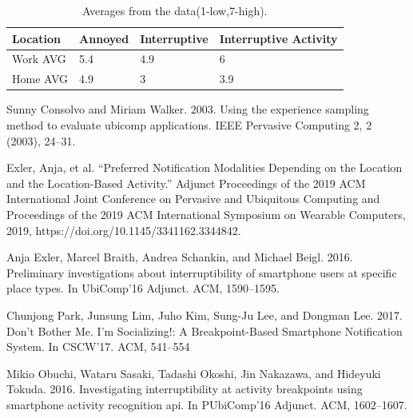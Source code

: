 \documentclass{vgtc}                          %
\begin{document}
\begin{table}[tb]
  \caption{Averages from the data(1-low,7-high).}
  \label{tab:vis_papers}
  \scriptsize%
	\centering%
  \begin{tabular}{|l|l|l|l|}
\hline
Location & Annoyed & Interruptive & Interruptive Activity \\ \hline
Work AVG    & 5.4                 & 4.9                  & 6                            \\ \hline
Home AVG     & 4.9                 & 3                    & 3.9                          \\ \hline
\end{tabular}
\end{table}




%

%
%
%


Sunny Consolvo and Miriam Walker. 2003. Using the experience sampling method to evaluate ubicomp applications. IEEE Pervasive Computing 2, 2 (2003), 24–31.

 Exler, Anja, et al. “Preferred Notification Modalities Depending on the Location and the Location-Based Activity.” Adjunct Proceedings of the 2019 ACM International Joint Conference on Pervasive and Ubiquitous Computing and Proceedings of the 2019 ACM International Symposium on Wearable Computers, 2019, https://doi.org/10.1145/3341162.3344842. 
 
 Anja Exler, Marcel Braith, Andrea Schankin, and Michael Beigl. 2016. Preliminary investigations about interruptibility of smartphone users at specific place types. In UbiComp’16 Adjunct. ACM, 1590–1595.

Chunjong Park, Junsung Lim, Juho Kim, Sung-Ju Lee, and Dongman Lee. 2017. Don’t Bother Me. I’m Socializing!: A Breakpoint-Based Smartphone Notification System. In CSCW’17. ACM, 541–554 

Mikio Obuchi, Wataru Sasaki, Tadashi Okoshi, Jin Nakazawa, and Hideyuki Tokuda. 2016. Investigating interruptibility at activity breakpoints using smartphone activity recognition api. In PUbiComp’16 Adjunct. ACM, 1602–1607.
\end{document}
